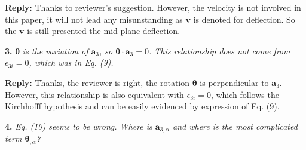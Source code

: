 \documentclass{article}
\begin{document}
\textbf{Reply:} Thanks to reviewer's suggestion. However, the velocity is not involved in this paper, it will not lead any misunstanding as $\boldsymbol v$ is denoted for deflection. So the $\boldsymbol v$ is still presented the mid-plane deflection.

\textbf{3.} $\boldsymbol \theta$ \textit{is the variation of $\boldsymbol a_3$, so $\boldsymbol \theta \cdot \boldsymbol a_3=0$. This relationship does not come from $\epsilon_{3i} = 0$, which was in Eq. (9).}

\textbf{Reply:} Thanks, the reviewer is right, the rotation $\boldsymbol \theta$ is perpendicular to $\boldsymbol a_3$. However, this relationship is also equivalent with $\epsilon_{3i}=0$, which follows the Kirchhofff hypothesis and can be easily evidenced by expression of Eq. (9).

\textbf{4.} \textit{Eq. (10) seems to be wrong. Where is $\boldsymbol a_{3,\alpha}$ and where is the most complicated term $\boldsymbol \theta_{,\alpha}$?}
\end{document}
